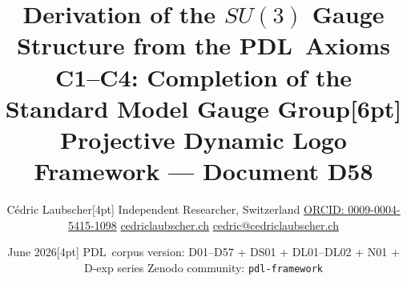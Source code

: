 \documentclass[11pt,a4paper]{article}
\def\\{}%
\def\SUthree{SU(3)}%
\def\PDL{PDL}%
\def\mathrm#1{#1}%
\def\textsc#1{#1}%
\theoremstyle{plain}
\theoremstyle{definition}
\theoremstyle{remark}
\newcommand{\PDL}{\textsc{PDL}}
\newcommand{\SUthree}{\mathrm{SU}(3)}
\begin{document}

\title{\textbf{Derivation of the $\SUthree$ Gauge Structure\\
from the \PDL\ Axioms C1--C4:\\
Completion of the Standard Model Gauge Group}\\[6pt]
{\large Projective Dynamic Logo Framework --- Document D58}}

\author{C\'edric Laubscher\\[4pt]
\small Independent Researcher, Switzerland\\
\small \href{https://orcid.org/0009-0004-5415-1098}{ORCID: 0009-0004-5415-1098}\\
\small \href{https://cedriclaubscher.ch}{cedriclaubscher.ch}\\
\small \href{mailto:cedric@cedriclaubscher.ch}{cedric@cedriclaubscher.ch}}

\date{June 2026\\[4pt]
\small \PDL\ corpus version: D01--D57 + DS01 + DL01--DL02 + N01 + D-exp series\\
\small Zenodo community: \texttt{pdl-framework}}

\maketitle
\end{document}
